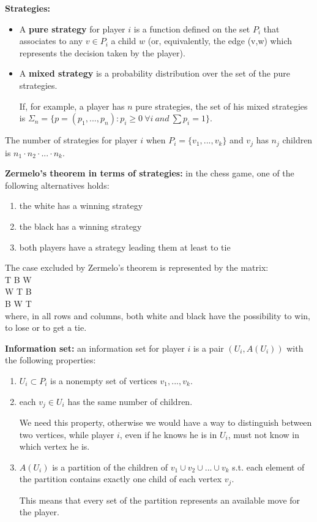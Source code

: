 \bigskip
\noindent \textbf{Strategies:}
\begin{itemize}
	\item A \textbf{pure strategy} for player $i$ is a function defined on the 
	set $P_i$ that associates to any $v \in P_i$ a child $w$ (or, equivalently, 
	the edge (v,w) which represents the decision taken by the player).
	\item A \textbf{mixed strategy} is a probability distribution over the set 
	of the pure strategies.

	\noindent If, for example, a player has $n$ pure strategies, the set of his 
	mixed strategies is $\Sigma_n = \{p = (p_1,...,p_n): p_i \geq 0 
	~\forall i ~and~ \sum{p_i} = 1\}$.
\end{itemize}
The number of strategies for player $i$ when $P_i = \{v_1,...,v_k\}$ and $v_j$ 
has $n_j$ children is $n_1 \cdot n_2 \cdot ... \cdot n_k$.

\bigskip
\noindent \textbf{Zermelo's theorem in terms of strategies:} in the chess game, 
one of the following alternatives holds:
\begin{enumerate}
	\item the white has a winning strategy
	\item the black has a winning strategy
	\item both players have a strategy leading them at least to tie
\end{enumerate}
The case excluded by Zermelo's theorem is represented by the matrix:\\
T \hspace{.6cm} B \hspace{.6cm}	W\\
W \hspace{.6cm} T \hspace{.6cm} B\\
B \hspace{.6cm}	W \hspace{.6cm}	T\\
where, in all rows and columns, both white and black have the possibility to 
win, to lose or to get a tie.

\bigskip
\noindent \textbf{Information set:} an information set for player $i$ is a pair 
$(U_i,A(U_i))$ with the following properties:
\begin{enumerate}
	\item $U_i \subset P_i$ is a nonempty set of vertices $v_1,...,v_k$.
	\item each $v_j \in U_i$ has the same number of children.

	\noindent We need this property, otherwise we would have a way to 
	distinguish between two vertices, while player $i$, even if he knows he is 
	in $U_i$, must not know in which vertex he is.

	\item $A(U_i)$ is a partition of the children of $v_1 \cup v_2 \cup ... 
	\cup v_k$ s.t. each element of the partition contains exactly one child of 
	each vertex $v_j$.

	\noindent This means that every set of the partition represents an available 
	move for the player.
\end{enumerate}


